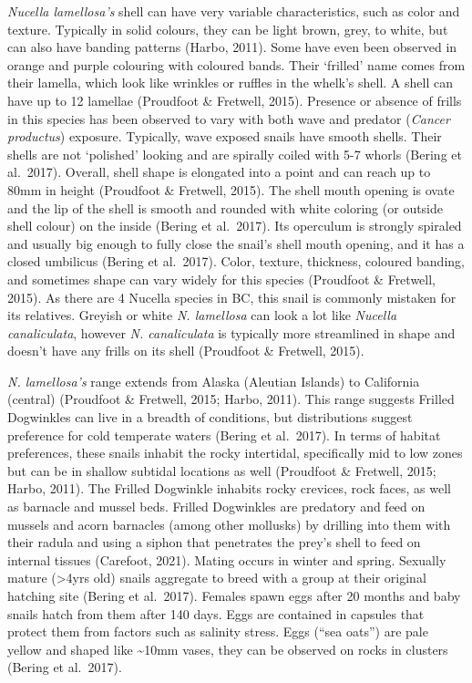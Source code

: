 \documentclass[
]{article}
\begin{document}
\emph{Nucella lamellosa's} shell can have very variable characteristics,
such as color and texture. Typically in solid colours, they can be light
brown, grey, to white, but can also have banding patterns (Harbo, 2011).
Some have even been observed in orange and purple colouring with
coloured bands. Their `frilled' name comes from their lamella, which
look like wrinkles or ruffles in the whelk's shell. A shell can have up
to 12 lamellae (Proudfoot \& Fretwell, 2015). Presence or absence of
frills in this species has been observed to vary with both wave and
predator (\emph{Cancer productus}) exposure. Typically, wave exposed
snails have smooth shells. Their shells are not `polished' looking and
are spirally coiled with 5-7 whorls (Bering et al.~2017). Overall, shell
shape is elongated into a point and can reach up to 80mm in height
(Proudfoot \& Fretwell, 2015). The shell mouth opening is ovate and the
lip of the shell is smooth and rounded with white coloring (or outside
shell colour) on the inside (Bering et al.~2017). Its operculum is
strongly spiraled and usually big enough to fully close the snail's
shell mouth opening, and it has a closed umbilicus (Bering et al.~2017).
Color, texture, thickness, coloured banding, and sometimes shape can
vary widely for this species (Proudfoot \& Fretwell, 2015). As there are
4 Nucella species in BC, this snail is commonly mistaken for its
relatives. Greyish or white \emph{N. lamellosa} can look a lot like
\emph{Nucella canaliculata}, however \emph{N. canaliculata} is typically
more streamlined in shape and doesn't have any frills on its shell
(Proudfoot \& Fretwell, 2015).

\emph{N. lamellosa's} range extends from Alaska (Aleutian Islands) to
California (central) (Proudfoot \& Fretwell, 2015; Harbo, 2011). This
range suggests Frilled Dogwinkles can live in a breadth of conditions,
but distributions suggest preference for cold temperate waters (Bering
et al.~2017). In terms of habitat preferences, these snails inhabit the
rocky intertidal, specifically mid to low zones but can be in shallow
subtidal locations as well (Proudfoot \& Fretwell, 2015; Harbo, 2011).
The Frilled Dogwinkle inhabits rocky crevices, rock faces, as well as
barnacle and mussel beds. Frilled Dogwinkles are predatory and feed on
mussels and acorn barnacles (among other mollusks) by drilling into them
with their radula and using a siphon that penetrates the prey's shell to
feed on internal tissues (Carefoot, 2021). Mating occurs in winter and
spring. Sexually mature (\textgreater4yrs old) snails aggregate to breed
with a group at their original hatching site (Bering et al.~2017).
Females spawn eggs after 20 months and baby snails hatch from them after
140 days. Eggs are contained in capsules that protect them from factors
such as salinity stress. Eggs (``sea oats'') are pale yellow and shaped
like \textasciitilde10mm vases, they can be observed on rocks in
clusters (Bering et al.~2017).
\end{document}
